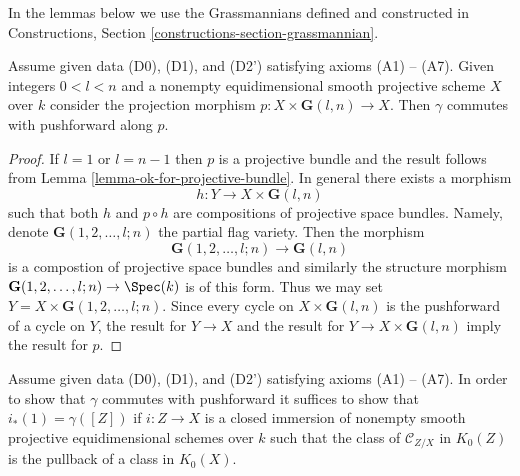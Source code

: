 \noindent
In the lemmas below we use the Grassmannians defined and constructed
in Constructions, Section \ref{constructions-section-grassmannian}.

\begin{lemma}
\label{lemma-grassmanian}
Assume given data (D0), (D1), and (D2') satisfying axioms (A1) -- (A7).
Given integers $0 < l < n$ and a nonempty equidimensional
smooth projective scheme $X$ over $k$ consider the projection morphism
$p : X \times \mathbf{G}(l, n) \to X$.
Then $\gamma$ commutes with pushforward along $p$.
\end{lemma}

\begin{proof}
If $l = 1$ or $l = n - 1$ then $p$ is a projective bundle and
the result follows from Lemma \ref{lemma-ok-for-projective-bundle}.
In general there exists a morphism
$$
h : Y \to X \times \mathbf{G}(l, n)
$$
such that both $h$ and $p \circ h$ are compositions of projective
space bundles. Namely, denote $\mathbf{G}(1, 2, \ldots, l; n)$
the partial flag variety. Then the morphism
$$
\mathbf{G}(1, 2, \ldots, l; n) \to \mathbf{G}(l, n)
$$
is a compostion of projective space bundles and similarly the
structure morphism $\mathbf{G}(1, 2, \ldots, l; n) \to \Spec(k)$
is of this form. Thus we may set $Y = X \times \mathbf{G}(1, 2, \ldots, l; n)$.
Since every cycle on $X \times \mathbf{G}(l, n)$ is the pushforward of
a cycle on $Y$, the result for $Y \to X$ and the result for
$Y \to X \times \mathbf{G}(l, n)$ imply the result for $p$.
\end{proof}

\begin{lemma}
\label{lemma-enough-better}
Assume given data (D0), (D1), and (D2') satisfying axioms (A1) -- (A7).
In order to show that $\gamma$ commutes with pushforward it suffices
to show that $i_*(1) = \gamma([Z])$ if $i : Z \to X$ is a closed
immersion of nonempty smooth projective equidimensional schemes over $k$
such that the class of $\mathcal{C}_{Z/X}$ in $K_0(Z)$ is the
pullback of a class in $K_0(X)$.
\end{lemma}

